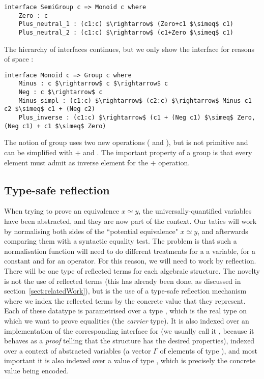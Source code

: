 \begin{lstlisting}
interface SemiGroup c => Monoid c where
    Zero : c    
    Plus_neutral_1 : (c1:c) $\rightarrow$ (Zero+c1 $\simeq$ c1)    
    Plus_neutral_2 : (c1:c) $\rightarrow$ (c1+Zero $\simeq$ c1)
\end{lstlisting}

The hierarchy of interfaces continues, but we only show the  interface for reasons of space :

\begin{lstlisting}
interface Monoid c => Group c where
    Minus : c $\rightarrow$ c $\rightarrow$ c
    Neg : c $\rightarrow$ c
    Minus_simpl : (c1:c) $\rightarrow$ (c2:c) $\rightarrow$ Minus c1 c2 $\simeq$ c1 + (Neg c2) 
    Plus_inverse : (c1:c) $\rightarrow$ (c1 + (Neg c1) $\simeq$ Zero, (Neg c1) + c1 $\simeq$ Zero)
\end{lstlisting}

The notion of group uses two new operations ( and ), but  is not primitive and can be simplified with $+$ and . The important property of a group is that every element  must admit  as inverse element for the $+$ operation.

\subsection{Type-safe reflection}
\label{sect:typeSafeReflection}
			
When trying to prove an equivalence $x \simeq y$, the universally-quantified variables have been abstracted, and they are now part of the context. Our tatics will work by normalising both sides of the ``potential equivalence" $x \simeq y$, and afterwards comparing them with a syntactic equality test. The problem is that such a normalisation function will need to do different treatments for a a variable, for a constant and for an operator. For this reason, we will need to work by reflection. There will be one type of reflected terms for each algebraic structure. The novelty is not the use of reflected terms (this has already been done, as discussed in section~\ref{sect:relatedWork}), but is the use of a type-safe reflection mechanism where we index the reflected terms by the concrete value that they represent. Each of these datatype is parametrised over a type , which is the real type on which we want to prove equalities (the \emph{carrier} type). It is also indexed over an implementation of the corresponding interface for  (we usually call it , because it behaves as a \emph{proof} telling that the structure  has the desired properties), indexed over a context of abstracted variables (a vector $\Gamma$ of  elements of type ), and most important it is also indexed over a value of type , which is precisely the concrete value being encoded.

